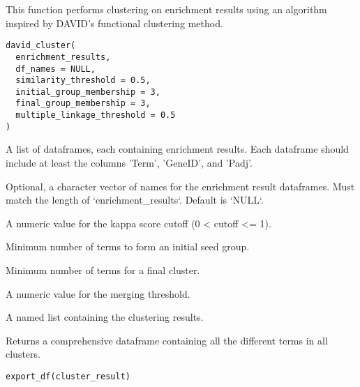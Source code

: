 \documentclass[a4paper]{book}
\begin{document}
%
\begin{Description}
This function performs clustering on enrichment results using an algorithm
inspired by DAVID's functional clustering method.
\end{Description}
%
\begin{Usage}
\begin{verbatim}
david_cluster(
  enrichment_results,
  df_names = NULL,
  similarity_threshold = 0.5,
  initial_group_membership = 3,
  final_group_membership = 3,
  multiple_linkage_threshold = 0.5
)
\end{verbatim}
\end{Usage}
%
\begin{Arguments}
\begin{ldescription}
\item[\code{enrichment\_results}] A list of dataframes, each containing enrichment results.
Each dataframe should include at least the columns 'Term', 'GeneID', and 'Padj'.

\item[\code{df\_names}] Optional, a character vector of names for the enrichment result dataframes. Must
match the length of `enrichment\_results`. Default is `NULL`.

\item[\code{similarity\_threshold}] A numeric value for the kappa score cutoff (0 < cutoff <= 1).

\item[\code{initial\_group\_membership}] Minimum number of terms to form an initial seed group.

\item[\code{final\_group\_membership}] Minimum number of terms for a final cluster.

\item[\code{multiple\_linkage\_threshold}] A numeric value for the merging threshold.
\end{ldescription}
\end{Arguments}
%
\begin{Value}
A named list containing the clustering results.
\end{Value}
%
\begin{Description}
Returns a comprehensive dataframe containing all the different terms in all clusters.
\end{Description}
%
\begin{Usage}
\begin{verbatim}
export_df(cluster_result)
\end{verbatim}
\end{Usage}
\end{document}
